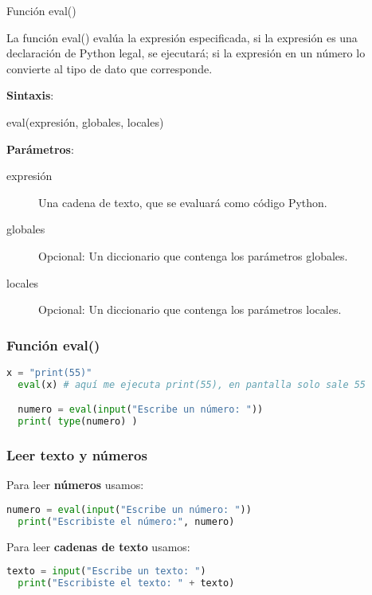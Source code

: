 \begin{frame}[c]{Función eval()}

  La función \textcolor{codeKeyword2}{eval}() evalúa la expresión
  especificada, si la expresión es una declaración de Python legal,
  se ejecutará; si la expresión en un número lo convierte al tipo de
  dato que corresponde.

  \vspace{\baselineskip}
  \textbf{Sintaxis}:

  \vspace{\baselineskip}
  \textcolor{codeKeyword2}{eval}(expresión, globales, locales)

  \vspace{\baselineskip}
  \textbf{Parámetros}:
  \begin{description}
    \item[expresión] Una cadena de texto, que se evaluará como código
      Python.
    \item[globales] Opcional: Un diccionario que contenga los parámetros
      globales.
    \item[locales] Opcional: Un diccionario que contenga los parámetros
      locales.
  \end{description}
\end{frame}

\begin{frame}[fragile]
  \frametitle{Función eval()}

  \begin{lstlisting}[language=Python]
  x = "print(55)"
  eval(x) # aquí me ejecuta print(55), en pantalla solo sale 55

  numero = eval(input("Escribe un número: "))
  print( type(numero) )
  \end{lstlisting}
\end{frame}


\begin{frame}[fragile]
  \frametitle{Leer texto y números}

  Para leer \textbf{números} usamos:
  \begin{lstlisting}[language=Python]
  numero = eval(input("Escribe un número: "))
  print("Escribiste el número:", numero)
  \end{lstlisting}

  \vspace{\baselineskip}
  Para leer \textbf{cadenas de texto} usamos:
  \begin{lstlisting}[language=Python]
  texto = input("Escribe un texto: ")
  print("Escribiste el texto: " + texto)
  \end{lstlisting}

\end{frame}


